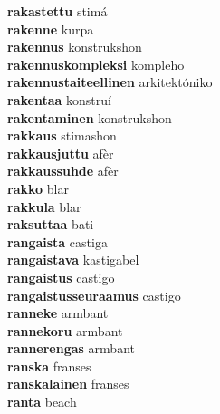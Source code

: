 \textbf{rakastettu } stimá \\
\textbf{rakenne } kurpa \\
\textbf{rakennus } konstrukshon \\
\textbf{rakennuskompleksi } kompleho \\
\textbf{rakennustaiteellinen } arkitektóniko \\
\textbf{rakentaa } konstruí \\
\textbf{rakentaminen } konstrukshon \\
\textbf{rakkaus } stimashon \\
\textbf{rakkausjuttu } afèr \\
\textbf{rakkaussuhde } afèr \\
\textbf{rakko } blar \\
\textbf{rakkula } blar \\
\textbf{raksuttaa } bati \\
\textbf{rangaista } castiga \\
\textbf{rangaistava } kastigabel \\
\textbf{rangaistus } castigo \\
\textbf{rangaistusseuraamus } castigo \\
\textbf{ranneke } armbant \\
\textbf{rannekoru } armbant \\
\textbf{rannerengas } armbant \\
\textbf{ranska } franses \\
\textbf{ranskalainen } franses \\
\textbf{ranta } beach \\
